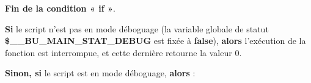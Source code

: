 \documentclass[a4paper,10pt]{article}
\begin{document}
\begin{justify}
    \textbf{\color{cond}Fin de la condition « if »}.
\end{justify}

\setlength{\parskip}{2em}


\begin{justify}
    \textbf{\color{cond}Si} le script n'est pas en mode déboguage (la variable globale de statut \textbf{\color{vars}\$\_\_BU\_MAIN\_STAT\_DEBUG} est fixée à \textbf{false}), \textbf{\color{cond}alors} l'exécution de la fonction est interrompue, et cette dernière retourne la valeur 0.
\end{justify}

\setlength{\parskip}{1em}

\begin{justify}
    \textbf{\color{cond}Sinon, si} le script est en mode déboguage, \textbf{\color{cond}alors} :
\end{justify}
\end{document}
